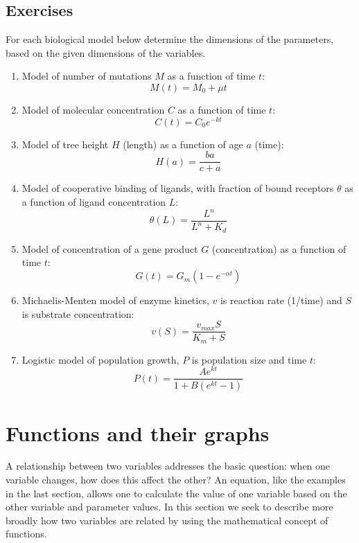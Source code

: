 \documentclass[
  letterpaper,
  DIV=11,
  numbers=noendperiod]{scrreprt}
\begin{document}
\hypertarget{exercises-1}{%
\subsection{Exercises}\label{exercises-1}}

For each biological model below determine the dimensions of the
parameters, based on the given dimensions of the variables.

\begin{enumerate}
\def\labelenumi{\arabic{enumi}.}
\item
  Model of number of mutations \(M\) as a function of time \(t\):
  \[ M(t) = M_0 + \mu t\]
\item
  Model of molecular concentration \(C\) as a function of time \(t\):
  \[ C(t) = C_0 e^{-kt} \]
\item
  Model of tree height \(H\) (length) as a function of age \(a\) (time):
  \[ H(a) = \frac{b a}{c + a}\]
\item
  Model of cooperative binding of ligands, with fraction of bound
  receptors \(\theta\) as a function of ligand concentration \(L\):
  \[ \theta (L) = \frac{L^n}{L^n + K_d}\]
\item
  Model of concentration of a gene product \(G\) (concentration) as a
  function of time \(t\): \[ G(t) = G_m (1 - e^{-\alpha t})\]
\item
  Michaelis-Menten model of enzyme kinetics, \(v\) is reaction rate
  (1/time) and \(S\) is substrate concentration:
  \[ v(S) = \frac{v_{max} S}{K_m + S}\]
\item
  Logistic model of population growth, \(P\) is population size and time
  \(t\): \[ P(t) = \frac{A e^{kt}}{1 + B(e^{kt} -1)} \]
\end{enumerate}

\hypertarget{sec:math2}{%
\section{Functions and their graphs}\label{sec:math2}}

A relationship between two variables addresses the basic question: when
one variable changes, how does this affect the other? An equation, like
the examples in the last section, allows one to calculate the value of
one variable based on the other variable and parameter values. In this
section we seek to describe more broadly how two variables are related
by using the mathematical concept of functions.
\end{document}

